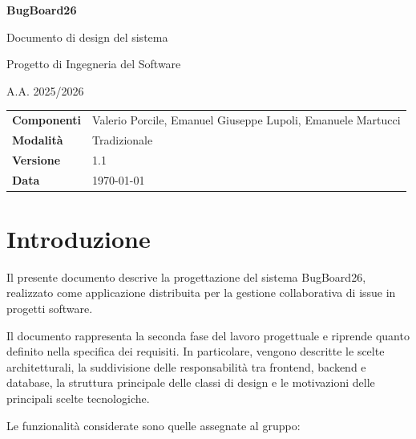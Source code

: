 \documentclass[12pt,a4paper]{article}
\begin{document}
\begin{titlepage}
    \centering
    \vspace*{2cm}

    {\Huge \textbf{BugBoard26}\par}
    \vspace{0.5cm}
    {\Large Documento di design del sistema\par}

    \vspace{1.5cm}

    {\large Progetto di Ingegneria del Software\par}
    {\large A.A. 2025/2026\par}

    \vfill

    \begin{tabular}{ll}
        \textbf{Componenti} & Valerio Porcile, Emanuel Giuseppe Lupoli, Emanuele Martucci \\
        \textbf{Modalità} & Tradizionale \\
        \textbf{Versione} & 1.1 \\
        \textbf{Data} & \today \\
    \end{tabular}

    \vfill
\end{titlepage}

{\small\tableofcontents}
\clearpage

\section{Introduzione}

Il presente documento descrive la progettazione del sistema BugBoard26, realizzato come applicazione distribuita per la gestione collaborativa di issue in progetti software.

Il documento rappresenta la seconda fase del lavoro progettuale e riprende quanto definito nella specifica dei requisiti. In particolare, vengono descritte le scelte architetturali, la suddivisione delle responsabilità tra frontend, backend e database, la struttura principale delle classi di design e le motivazioni delle principali scelte tecnologiche.

Le funzionalità considerate sono quelle assegnate al gruppo:
\end{document}
